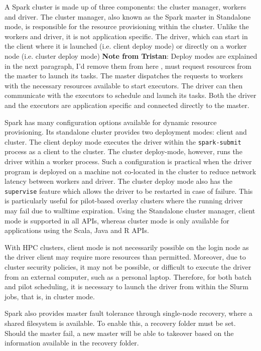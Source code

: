 \documentclass{IEEEtran}
\newcommand{\tristan}[1]{\color{red}\textbf{Note from Tristan}:
      #1 \color{black}}
\newcommand{\TG}[1]{\tristan{#1}}
\begin{document}
    A Spark cluster is made up of three components: the cluster manager, workers and
    driver. The cluster manager, also known as the Spark master in Standalone mode, is responsible for the
    resource provisioning within the cluster. Unlike the workers and driver, it is not
    application specific. The driver, which can start in the client where it is launched (i.e. client deploy mode)
    or directly on a worker node (i.e. cluster deploy mode) \TG{Deploy modes are explained in the next paragraph,
    I'd remove them from here}, must request resources from the master
    to launch its tasks. The master dispatches the requests to workers with the necessary resources available to start
    executors. The driver can then communicate with the executors to schedule and launch its tasks. Both the driver and
    the executors are application specific and connected directly to the master. 

    Spark has many configuration options available for dynamic resource provisioning.
    Its standalone cluster provides two deployment modes: client and cluster. The client
    deploy mode executes the driver within the \texttt{spark-submit} process as
    a client to the cluster. The cluster deploy-mode, however, runs the driver within
    a worker process. Such a configuration is practical when the driver program
    is deployed on a machine not co-located in the cluster to reduce network 
    latency between workers and driver. The cluster deploy mode also has the \texttt{supervise}
    feature which allows the driver to be restarted in case of failure.
    This is particularly useful for
    pilot-based overlay clusters where the running driver may fail due to walltime expiration.
    Using the Standalone cluster manager, client mode is supported in all APIs, whereas cluster mode is
    only available for applications using the Scala, Java and R APIs.

    With HPC clusters, client mode is not necessarily possible on the login node as the
    driver client may require more resources than permitted. Moreover, due to cluster
    security policies, it may not be possible, or difficult to execute the driver from
    an external computer, such as a personal laptop. Therefore, for both batch and pilot
    scheduling, it is necessary to launch the driver from within the Slurm jobs, that is, in cluster mode.

    Spark also provides master fault tolerance through single-node recovery, where a shared
    filesystem is available. To enable this, a recovery folder must be set. Should the master
    fail, a new master will be able to takeover based on the information available in the recovery
    folder.
\end{document}

